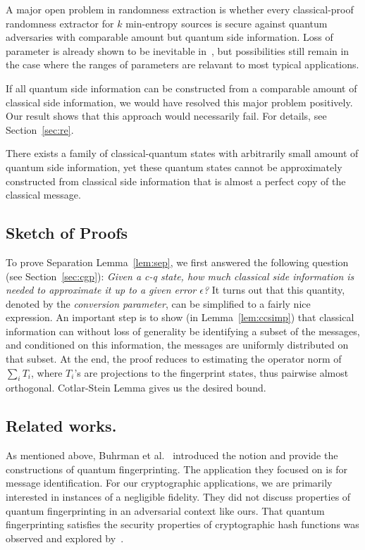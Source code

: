A major open problem in randomness extraction is whether every classical-proof randomness extractor for $k$ min-entropy sources is secure against quantum adversaries with comparable amount but quantum side information. Loss of parameter is already shown to be inevitable in~\cite{gavinsky2007exponential}, but possibilities still remain in the case where the ranges of parameters are relavant to most typical applications. 

If all quantum side information can be constructed from a comparable amount of classical side information, we would have resolved this major problem positively. Our result shows that this approach would necessarily fail.
For details, see Section~\ref{sec:re}.


\begin{theorem}
    There exists a family of classical-quantum states with arbitrarily small amount of quantum side information, yet
    these quantum states cannot be approximately constructed from classical side information that is almost a perfect copy of the classical message.
\end{theorem}

\subsection{Sketch of Proofs}
To prove Separation Lemma~\ref{lem:sep},  we first answered the following question (see Section~\ref{sec:cgp}): 
{\em Given a c-q state, how much classical side information is needed to approximate it up to a given error $\epsilon$?}
It turns out that this quantity, denoted by the \emph{conversion parameter}, can be simplified to a fairly nice expression. An important step is to show (in Lemma~\ref{lem:ccsimp}) that  classical information can without loss of generality be identifying a subset of the messages, and conditioned on this information, the messages are uniformly distributed on that subset. 
At the end, the proof reduces to estimating the operator norm of  $\sum_iT_i$, where $T_i$'s are projections to the fingerprint states, thus pairwise almost orthogonal. Cotlar-Stein Lemma gives us the desired bound. %

\subsection{Related works.}
As mentioned above, Buhrman et al.~\cite{buhrman2001quantum} introduced the notion and provide the constructions of quantum fingerprinting. The application they focused on is for message identification. For our cryptographic applications, we are primarily interested in instances of a negligible fidelity. They did not discuss properties of quantum fingerprinting in an adversarial context like ours. That quantum fingerprinting satisfies the security properties of cryptographic hash functions was observed and explored by~\cite{ablayev2013cryptographic,vasiliev2014cryptographic}. 

